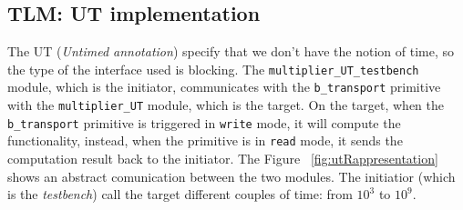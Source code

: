 \documentclass[]{IEEEtran}
\begin{document}
		\subsection{TLM: UT implementation}
		\label{sec:ut}
		The UT (\textit{Untimed annotation}) specify that we don't have the notion of time, so the type of the interface used is blocking.
		The \verb|multiplier_UT_testbench| module, which is the initiator, communicates with the \verb|b_transport| primitive with the \verb|multiplier_UT| module, which is the target. 
		On the target, when the \verb|b_transport| primitive is triggered in \verb|write| mode, it will compute the functionality, instead, when the primitive is in \verb|read| mode, it sends the computation result back to the initiator. The Figure ~\ref{fig:utRappresentation} shows an abstract comunication between the two modules.
		The initiatior (which is the \textit{testbench}) call the target different couples of time: from $10^3$ to $10^9$.
\end{document}
